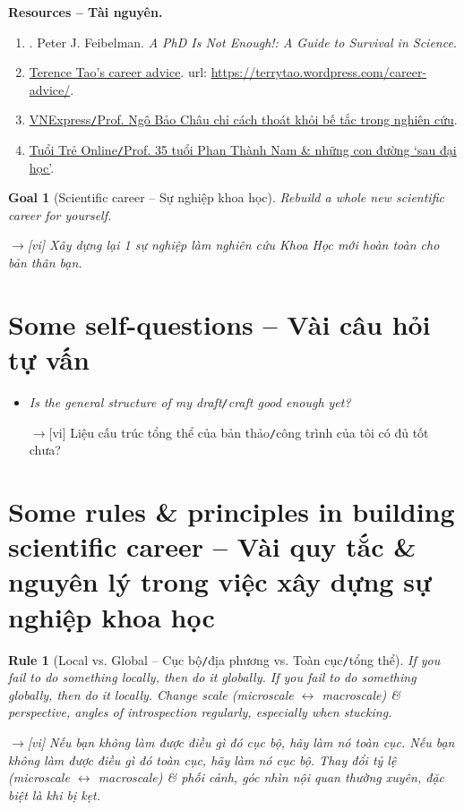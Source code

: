 \documentclass[12pt,twoside]{book}
\newtheorem{goal}{Goal}
\newtheorem{Rule}{Rule}
\begin{document}
\noindent\textbf{\textsf{Resources -- Tài nguyên.}}
\begin{enumerate}
	\item \cite{Feibelman2011}. {\sc Peter J. Feibelman}. {\it A PhD Is Not Enough!: A Guide to Survival in Science}.
	\item \href{https://terrytao.wordpress.com/career-advice/}{{\sc Terence Tao}'s career advice}. {\sc url}: \url{https://terrytao.wordpress.com/career-advice/}.
	\item \href{https://vnexpress.net/gs-ngo-bao-chau-chi-cach-thoat-khoi-be-tac-trong-nghien-cuu-4446449.html}{VNExpress{\tt/}Prof. {\sc Ngô Bảo Châu} chỉ cách thoát khỏi bế tắc trong nghiên cứu}.
	\item \href{https://tuoitre.vn/giao-su-35-tuoi-phan-thanh-nam-va-nhung-con-duong-sau-dai-hoc-20200515114136566.htm}{Tuổi Trẻ Online{\tt/}Prof. 35 tuổi {\sc Phan Thành Nam} \& những con đường `sau đại học'}.
\end{enumerate}

\begin{goal}[Scientific career -- Sự nghiệp khoa học]
	Rebuild a whole new scientific career for yourself.
	
	{\sf[en]$\to$[vi]} Xây dựng lại 1 sự nghiệp làm nghiên cứu Khoa Học mới hoàn toàn cho bản thân bạn.
\end{goal}

\section{Some self-questions -- Vài câu hỏi tự vấn}

\begin{itemize}
	\item {\it Is the general structure of my draft{\tt/}craft good enough yet?}
	
	{\sf[en]$\to$[vi]} Liệu cấu trúc tổng thể của bản thảo{\tt/}công trình của tôi có đủ tốt chưa?
\end{itemize}

\section{Some rules \& principles in building scientific career -- Vài quy tắc \& nguyên lý trong việc xây dựng sự nghiệp khoa học}

\begin{Rule}[Local vs. Global -- Cục bộ{\tt/}địa phương vs. Toàn cục{\tt/}tổng thể]
	If you fail to do something locally, then do it globally. If you fail to do something globally, then do it locally. Change scale (microscale $\leftrightarrow$ macroscale) \& perspective, angles of introspection regularly, especially when stucking.
	
	{\sf[en]$\to$[vi]} Nếu bạn không làm được điều gì đó cục bộ, hãy làm nó toàn cục. Nếu bạn không làm được điều gì đó toàn cục, hãy làm nó cục bộ. Thay đổi tỷ lệ (microscale $\leftrightarrow$ macroscale) \& phối cảnh, góc nhìn nội quan thường xuyên, đặc biệt là khi bị kẹt.
\end{Rule}
\end{document}
